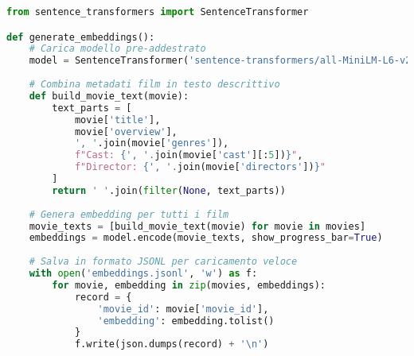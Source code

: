 \documentclass[11pt,a4paper]{article}
\begin{document}
\begin{lstlisting}[language=Python, caption=Pipeline Generazione Embedding]
from sentence_transformers import SentenceTransformer

def generate_embeddings():
    # Carica modello pre-addestrato
    model = SentenceTransformer('sentence-transformers/all-MiniLM-L6-v2')
    
    # Combina metadati film in testo descrittivo
    def build_movie_text(movie):
        text_parts = [
            movie['title'],
            movie['overview'],
            ', '.join(movie['genres']),
            f"Cast: {', '.join(movie['cast'][:5])}",
            f"Director: {', '.join(movie['directors'])}"
        ]
        return ' '.join(filter(None, text_parts))
    
    # Genera embedding per tutti i film
    movie_texts = [build_movie_text(movie) for movie in movies]
    embeddings = model.encode(movie_texts, show_progress_bar=True)
    
    # Salva in formato JSONL per caricamento veloce
    with open('embeddings.jsonl', 'w') as f:
        for movie, embedding in zip(movies, embeddings):
            record = {
                'movie_id': movie['movie_id'],
                'embedding': embedding.tolist()
            }
            f.write(json.dumps(record) + '\n')
\end{lstlisting}
\end{document}
